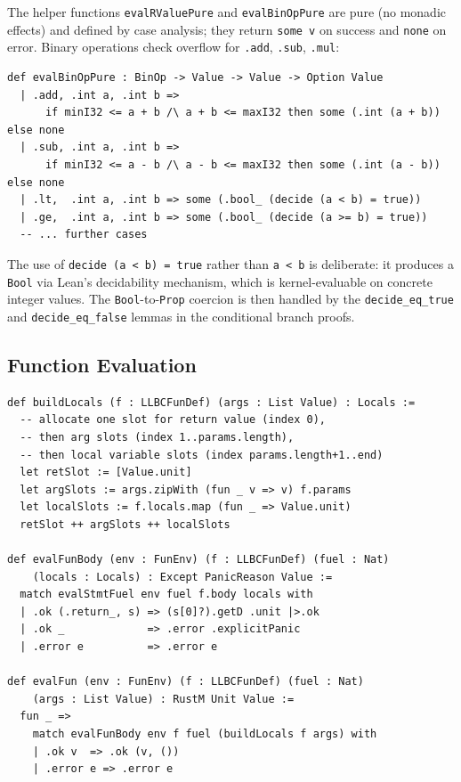 The helper functions \texttt{evalRValuePure} and \texttt{evalBinOpPure} are
pure (no monadic effects) and defined by case analysis; they return
\texttt{some v} on success and \texttt{none} on error. Binary operations check
overflow for \texttt{.add}, \texttt{.sub}, \texttt{.mul}:

\begin{lstlisting}[caption={evalBinOpPure for arithmetic.},label={lst:binop}]
def evalBinOpPure : BinOp -> Value -> Value -> Option Value
  | .add, .int a, .int b =>
      if minI32 <= a + b /\ a + b <= maxI32 then some (.int (a + b)) else none
  | .sub, .int a, .int b =>
      if minI32 <= a - b /\ a - b <= maxI32 then some (.int (a - b)) else none
  | .lt,  .int a, .int b => some (.bool_ (decide (a < b) = true))
  | .ge,  .int a, .int b => some (.bool_ (decide (a >= b) = true))
  -- ... further cases
\end{lstlisting}

The use of \texttt{decide (a < b) = true} rather than \texttt{a < b} is
deliberate: it produces a \texttt{Bool} via Lean's decidability mechanism,
which is kernel-evaluable on concrete integer values. The \texttt{Bool}-to-\texttt{Prop}
coercion is then handled by the \texttt{decide\_eq\_true} and
\texttt{decide\_eq\_false} lemmas in the conditional branch proofs.

\subsection{Function Evaluation}

\begin{lstlisting}[caption={Top-level function evaluation.},label={lst:evalfun}]
def buildLocals (f : LLBCFunDef) (args : List Value) : Locals :=
  -- allocate one slot for return value (index 0),
  -- then arg slots (index 1..params.length),
  -- then local variable slots (index params.length+1..end)
  let retSlot := [Value.unit]
  let argSlots := args.zipWith (fun _ v => v) f.params
  let localSlots := f.locals.map (fun _ => Value.unit)
  retSlot ++ argSlots ++ localSlots

def evalFunBody (env : FunEnv) (f : LLBCFunDef) (fuel : Nat)
    (locals : Locals) : Except PanicReason Value :=
  match evalStmtFuel env fuel f.body locals with
  | .ok (.return_, s) => (s[0]?).getD .unit |>.ok
  | .ok _             => .error .explicitPanic
  | .error e          => .error e

def evalFun (env : FunEnv) (f : LLBCFunDef) (fuel : Nat)
    (args : List Value) : RustM Unit Value :=
  fun _ =>
    match evalFunBody env f fuel (buildLocals f args) with
    | .ok v  => .ok (v, ())
    | .error e => .error e
\end{lstlisting}

